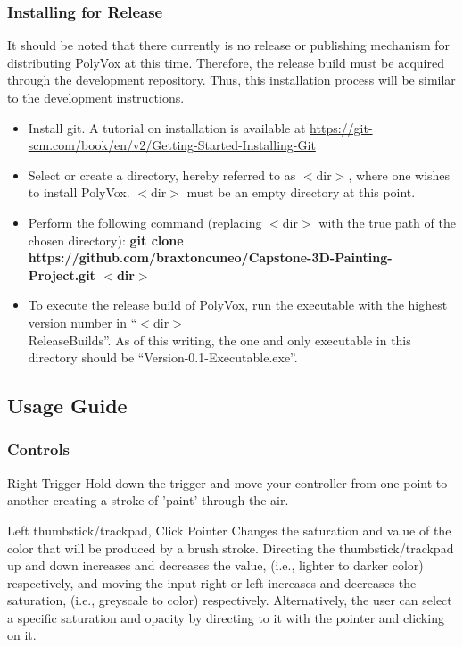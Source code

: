 \documentclass[onecolumn, draftclsnofoot,10pt, compsoc]{IEEEtran}
\newcounter{threesection}[subsubsection]
\begin{document}
\subsubsection{Installing for Release}
It should be noted that there currently is no release or publishing mechanism for distributing PolyVox at this time. Therefore, the release build must be acquired through the development repository. Thus, this installation process will be similar to the development instructions.
\begin{itemize}
\item Install git. A tutorial on installation is available at \url{https://git-scm.com/book/en/v2/Getting-Started-Installing-Git}
\item Select or create a directory, hereby referred to as $<$dir$>$, where one wishes to install PolyVox. $<$dir$>$ must be an empty directory at this point.
\item Perform the following command (replacing $<$dir$>$ with the true path of the chosen directory): \textbf{git clone https://github.com/braxtoncuneo/Capstone-3D-Painting-Project.git $<$dir$>$}
\item To execute the release build of PolyVox, run the executable with the highest version number in “$<$dir$>$\\ReleaseBuilds”. As of this writing, the one and only executable in this directory should be “Version-0.1-Executable.exe”.
\end{itemize}


\subsection{Usage Guide}
\subsubsection{Controls}
Right Trigger Hold down the trigger and move your controller from one point to another creating a stroke of 'paint' through the air.

Left thumbstick/trackpad, Click Pointer Changes the saturation and value of the color that will be produced by a brush stroke.
Directing the thumbstick/trackpad up and down increases and decreases the value, (i.e., lighter to darker color) respectively, and moving the input right or left increases and decreases the saturation, (i.e., greyscale to color) respectively.
Alternatively, the user can select a specific saturation and opacity by directing to it with the pointer and clicking on it.
\end{document}
